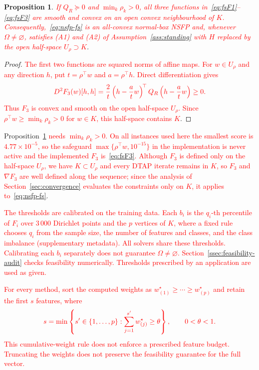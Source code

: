\documentclass[]{interact}
\theoremstyle{plain}
\newtheorem{proposition}[theorem]{Proposition}
\theoremstyle{definition}
\theoremstyle{remark}
\begin{document}
\begin{proposition}\label{prop:fs-reg}
\leavevmode\textcolor{red}{If $Q_R\succeq0$ and $\min_k\rho_k>0$, all three functions in~\eqref{eq:fsF1}--\eqref{eq:fsF3} are smooth and convex on an open convex neighbourhood of $K$. Consequently,~\eqref{eq:nsfp-fs} is an all-convex normal-box NSFP and, whenever $\Omega\ne\varnothing$, satisfies (A1) and (A2) of Assumption~\ref{ass:standing} with $H$ replaced by the open half-space $U_\rho\supset K$}.
\end{proposition}
\begin{proof}
\leavevmode\textcolor{red}{The first two functions are squared norms of affine maps. For $w\in U_\rho$ and any direction $h$, put $t=\rho^{\top}w$ and $a=\rho^{\top}h$. Direct differentiation gives}
\begin{equation}\label{eq:fsF3-curvature}\textcolor{red}{
D^2F_3(w)[h,h]=\frac2t\left(h-\frac atw\right)^{\!\top}Q_R\left(h-\frac atw\right)\ge0.
}\end{equation}
\leavevmode\textcolor{red}{Thus $F_3$ is convex and smooth on the open half-space $U_\rho$. Since $\rho^{\top}w\ge\min_k\rho_k>0$ for $w\in K$, this half-space contains $K$}.
\end{proof}

Proposition~\leavevmode\textcolor{red}{\ref{prop:fs-reg} needs $\min_k\rho_k>0$. On all instances used here the smallest score is $4.77\times10^{-5}$, so the safeguard $\max\{\rho^\top w,10^{-15}\}$ in the implementation is never active and the implemented $F_3$ is~\eqref{eq:fsF3}. Although $F_3$ is defined only on the half-space $U_\rho$, we have $K\subset U_\rho$ and every DTAP iterate remains in $K$, so $F_3$ and $\nabla F_3$ are well defined along the sequence; since the analysis of Section~\ref{sec:convergence} evaluates the constraints only on $K$, it applies to~\eqref{eq:nsfp-fs}}.

\leavevmode\textcolor{red}{The thresholds are calibrated on the training data. Each $b_i$ is the $q_i$-th percentile of $F_i$ over $3\,000$ Dirichlet points and the $p$ vertices of $K$, where a fixed rule chooses $q_i$ from the sample size, the number of features and classes, and the class imbalance (supplementary metadata). All solvers share these thresholds. Calibrating each $b_i$ separately does not guarantee $\Omega\ne\varnothing$. Section~\ref{ssec:feasibility-audit} checks feasibility numerically. Thresholds prescribed by an application are used as given.}

\leavevmode\textcolor{red}{For every method, sort the computed weights as $w^\star_{(1)}\ge\cdots\ge w^\star_{(p)}$ and retain the first $s$ features, where}
\begin{equation}\label{eq:thetaRule}\textcolor{red}{
s=\min\left\{s'\in\{1,\ldots,p\}:\sum_{j=1}^{s'}w^\star_{(j)}\ge\theta\right\},\qquad 0<\theta<1.
}\end{equation}
\leavevmode\textcolor{red}{This cumulative-weight rule does not enforce a prescribed feature budget. Truncating the weights does not preserve the feasibility guarantee for the full vector.}
\end{document}
